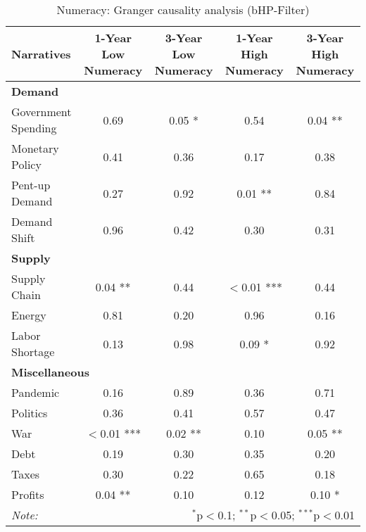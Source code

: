 \begin{sidewaystable}[ht]
\centering
\caption{Numeracy: Granger causality analysis (bHP-Filter)}\label{table:granger}

\begin{tabular}{lcccc}
\toprule
\textbf{Narratives} & \textbf{1-Year Low Numeracy} & \textbf{3-Year Low Numeracy} & \textbf{1-Year High Numeracy} & \textbf{3-Year High Numeracy} \\
\midrule
\multicolumn{5}{l}{\textbf{Demand}} \\
\midrule
Government Spending & 0.69 & 0.05 * & 0.54 & 0.04 ** \\
Monetary Policy & 0.41 & 0.36 & 0.17 & 0.38 \\
Pent-up Demand & 0.27 & 0.92 & 0.01 ** & 0.84 \\
Demand Shift & 0.96 & 0.42 & 0.30 & 0.31 \\
\midrule
\multicolumn{5}{l}{\textbf{Supply}} \\
\midrule
Supply Chain & 0.04 ** & 0.44 & $<$0.01 *** & 0.44 \\
Energy & 0.81 & 0.20 & 0.96 & 0.16 \\
Labor Shortage & 0.13 & 0.98 & 0.09 * & 0.92 \\
\midrule
\multicolumn{5}{l}{\textbf{Miscellaneous}} \\
\midrule
Pandemic & 0.16 & 0.89 & 0.36 & 0.71 \\
Politics & 0.36 & 0.41 & 0.57 & 0.47 \\
War & $<$0.01 *** & 0.02 ** & 0.10 & 0.05 ** \\
Debt & 0.19 & 0.30 & 0.35 & 0.20 \\
Taxes & 0.30 & 0.22 & 0.65 & 0.18 \\
Profits & 0.04 ** & 0.10 & 0.12 & 0.10 * \\
\midrule
\bottomrule
\textit{Note:}  & \multicolumn{4}{r}{$^{*}$p$<$0.1; $^{**}$p$<$0.05; $^{***}$p$<$0.01} \\
\bottomrule
\end{tabular}
\end{sidewaystable}

